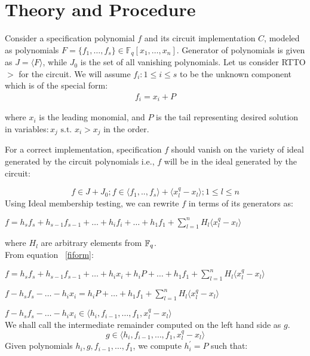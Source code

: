 \section{Theory and Procedure}
Consider a specification polynomial $f$ and its circuit implementation $C$, modeled as polynomials $F = \{f_1,\dots,f_s\}\in \mathbb{F}_q[x_1,\dots, x_n]$. Generator of polynomials is given as $J=\langle F \rangle$, while $J_0$ is the set of all vanishing polynomials. Let us consider RTTO$>$%
 for the circuit. We will assume $f_i:1\le i \le s$ to be the unknown component which is of the special form:
\begin{gather} 
\label{fiform}
f_i = x_i + P
\end{gather}

where $x_i$ is the leading monomial, and $P$ is the tail representing desired solution in variables$:x_j \text{ s.t. } x_i>x_j$ in the order. 

For a correct implementation, specification $f$ should vanish on the variety of ideal generated by the circuit polynomials i.e., $f$ will be in the ideal generated by the circuit:

\begin{equation}
\label{member}
f \in J + J_0; 
f \in \langle f_1,..,f_s\rangle + \langle x_l^q-x_l\rangle;1\le l \le n
\end{equation}
Using Ideal membership testing, we can rewrite $f$ in terms of its generators as:

$f = h_sf_s + h_{s-1}f_{s-1} +\dots+h_if_i+\dots+h_1f_1+\sum\limits_{l=1}^{n}H_l\langle x_l^q-x_l\rangle$

where $H_l$ are arbitrary elements from ${\mathbb{F}}_{q}$.\\
From equation ~\ref{fiform}:

{\small$f = h_sf_s + h_{s-1}f_{s-1} +\dots+h_ix_i+h_iP+\dots+h_1f_1+\sum\limits_{l=1}^{n}H_l\langle x_l^q-x_l\rangle$}

$f - h_sf_s -\dots-h_ix_i = h_iP+\dots+h_1f_1+\sum\limits_{l=1}^{n}H_l\langle x_l^q-x_l\rangle$

$f - h_sf_s -\dots-h_ix_i \in \langle h_i,f_{i-1},\dots,f_1, x_l^q-x_l\rangle$\\
We shall call the intermediate remainder computed on the left hand side as $g$.
\begin{equation}
g \in \langle h_i,f_{i-1},\dots,f_1, x_l^q-x_l\rangle
\end{equation}
Given polynomials $h_i, g, f_{i-1},\dots,f_1$, we compute $h_i^{'}=P$ such that:

